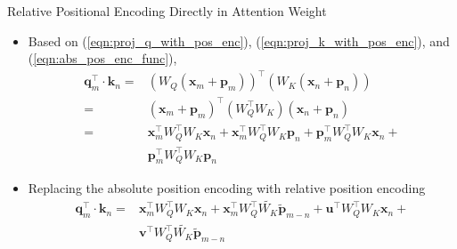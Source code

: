 \documentclass{beamer}
\newcommand{\transpose}{^{\top}}
\begin{document}
	\begin{frame}{Relative Positional Encoding Directly in Attention Weight}
		\begin{itemize}
			\item Based on (\ref{eqn:proj_q_with_pos_enc}), (\ref{eqn:proj_k_with_pos_enc}), and (\ref{eqn:abs_pos_enc_func}),
			\begin{equation}\label{eqn:abs_pos_enc_func_in_attn_comp}
				\begin{split}
					\mathbf{q}_m\transpose \cdot \mathbf{k}_n = & \left(W_Q(\mathbf{x}_m + \mathbf{p}_m)\right)\transpose\left(W_K(\mathbf{x}_n + \mathbf{p}_n)\right) \\
					= & \left(\mathbf{x}_m + \mathbf{p}_m\right)\transpose(W_Q\transpose W_K)\left(\mathbf{x}_n + \mathbf{p}_n\right) \\
					= & \mathbf{x}_m\transpose W_Q\transpose W_K \mathbf{x}_n + \mathbf{x}_m\transpose W_Q\transpose W_K \mathbf{p}_n +  \mathbf{p}_m\transpose W_Q\transpose W_K \mathbf{x}_n + \\&\mathbf{p}_m\transpose W_Q\transpose W_K \mathbf{p}_n 			
				\end{split}
			\end{equation}
			\item Replacing the absolute position encoding with relative position encoding
			\begin{equation}\label{eqn:rel_pos_enc_func_in_attn_comp_with_uv}
				\begin{split}				
					\mathbf{q}_m\transpose \cdot \mathbf{k}_n = &\mathbf{x}_m\transpose W_Q\transpose W_K \mathbf{x}_n + \mathbf{x}_m\transpose W_Q\transpose \widetilde{W_K} \widetilde{\mathbf{p}}_{m-n} +  \mathbf{u}\transpose W_Q\transpose W_K \mathbf{x}_n + \\& \mathbf{v}\transpose W_Q\transpose \widetilde{W_K} \widetilde{\mathbf{p}}_{m-n}
				\end{split}
			\end{equation}
		\end{itemize}
	\end{frame}
	
\end{document}

